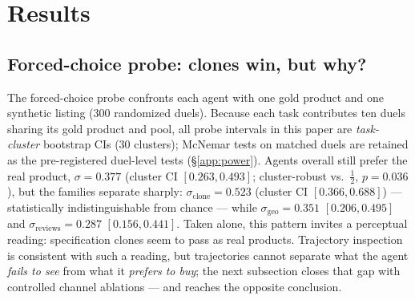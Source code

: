 \section{Results}
\label{sec:results}

\subsection{Forced-choice probe: clones win, but why?}
\label{sec:res-probe}
The forced-choice probe confronts each agent with one gold product and one
synthetic listing (300 randomized duels). Because each task contributes ten
duels sharing its gold product and pool, all probe intervals in this paper
are \emph{task-cluster} bootstrap CIs (30 clusters); McNemar tests on
matched duels are retained as the pre-registered duel-level tests
(\S\ref{app:power}). Agents overall still prefer the
real product, $\sigma=0.377$ (cluster CI $[0.263,0.493]$; cluster-robust
vs.\ $\tfrac12$, $p=0.036$), but the families separate sharply:
$\sigma_{\text{clone}}=0.523$ (cluster CI $[0.366,0.688]$) ---
statistically indistinguishable from chance --- while
$\sigma_{\text{geo}}=0.351$ $[0.206,0.495]$ and
$\sigma_{\text{reviews}}=0.287$ $[0.156,0.441]$. Taken alone, this pattern invites a
perceptual reading: specification clones seem to pass as real products.
Trajectory inspection is consistent with such a reading, but
trajectories cannot separate what the agent \emph{fails to
see} from what it \emph{prefers to buy}; the next subsection closes that
gap with controlled channel ablations --- and reaches the opposite
conclusion.

